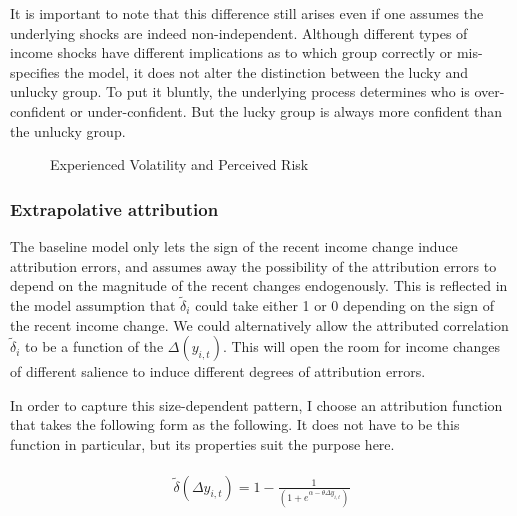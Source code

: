 \documentclass[12pt,notitlepage,onecolumn,aps,pra]{article}
\begin{document}
It is important to note that this difference still arises even if one
assumes the underlying shocks are indeed non-independent. Although
different types of income shocks have different implications as to which
group correctly or mis-specifies the model, it does not alter the
distinction between the lucky and unlucky group. To put it bluntly, the
underlying process determines who is over-confident or under-confident.
But the lucky group is always more confident than the unlucky group.


    \begin{figure*}[!ht]
        \begin{center}\end{center}
        \caption{Experienced Volatility and Perceived Risk}
        \label{fig:var_experience_var}
    \end{figure*}
    
    \hypertarget{extrapolative-attribution}{%
\subsubsection{Extrapolative
attribution}\label{extrapolative-attribution}}

The baseline model only lets the sign of the recent income change induce
attribution errors, and assumes away the possibility of the attribution
errors to depend on the magnitude of the recent changes endogenously.
This is reflected in the model assumption that \(\tilde \delta_i\) could
take either 1 or 0 depending on the sign of the recent income change. We
could alternatively allow the attributed correlation \(\tilde \delta_i\)
to be a function of the \(\Delta(y_{i,t})\). This will open the room for
income changes of different salience to induce different degrees of
attribution errors.

In order to capture this size-dependent pattern, I choose an attribution
function that takes the following form as the following. It does not
have to be this function in particular, but its properties suit the
purpose here.

\begin{eqnarray}
\begin{split}
\tilde \delta(\Delta y_{i,t}) = 1- \frac{1}{(1+e^{\alpha-\theta \Delta y_{i,t}})}
\end{split}
\end{eqnarray}
\end{document}
